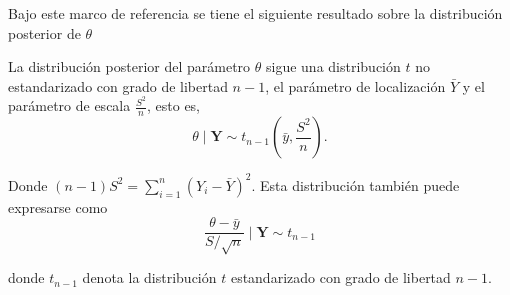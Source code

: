 \documentclass[10pt,openright]{book}\usepackage[]{graphicx}\usepackage[]{color}
\begin{document}
Bajo este marco de referencia se tiene el siguiente resultado sobre la distribuci\'on posterior de $\theta$
\begin{Res}\label{pos_theta_no_informativa}
La distribuci\'on posterior del par\'ametro $\theta$ sigue una distribuci\'on $t$ no estandarizado con grado de libertad $n-1$, el par\'ametro de localizaci\'on $\bar{Y}$ y el par\'ametro de escala $\frac{S^2}{n}$, esto es, 
\begin{equation*}
\theta \mid \mathbf{Y}\sim t_{n-1}\left(\bar{y},\frac{S^2}{n}\right).
\end{equation*}

Donde $(n-1)S^2=\sum_{i=1}^n(Y_i-\bar{Y})^2$. Esta distribuci\'on tambi\'en puede expresarse como
\begin{equation*}
\frac{\theta-\bar{y}}{S/\sqrt{n}} \mid \mathbf{Y} \sim t_{n-1}
\end{equation*}

donde $t_{n-1}$ denota la distribuci\'on $t$ estandarizado con grado de libertad $n-1$.
\end{Res}
\end{document}

